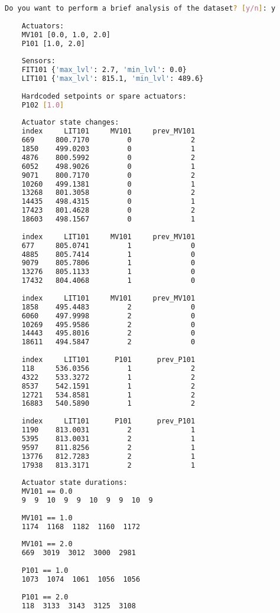 \begin{lstlisting}[language=bash,numbers=none,caption={Example of preliminary system analysis},label=lst:4_brief_infos]
	Do you want to perform a brief analysis of the dataset? [y/n]: y
	
	Actuators: 
	MV101 [0.0, 1.0, 2.0]
	P101 [1.0, 2.0]
	
	Sensors: 
	FIT101 {'max_lvl': 2.7, 'min_lvl': 0.0}
	LIT101 {'max_lvl': 815.1, 'min_lvl': 489.6}
	
	Hardcoded setpoints or spare actuators: 
	P102 [1.0]
	
	Actuator state changes:
	index     LIT101     MV101     prev_MV101
	669     800.7170         0              2
	1850    499.0203         0              1
	4876    800.5992         0              2
	6052    498.9026         0              1
	9071    800.7170         0              2
	10260   499.1381         0              1
	13268   801.3058         0              2
	14435   498.4315         0              1
	17423   801.4628         0              2
	18603   498.1567         0              1
	
	index     LIT101     MV101     prev_MV101
	677     805.0741         1              0
	4885    805.7414         1              0
	9079    805.7806         1              0
	13276   805.1133         1              0
	17432   804.4068         1              0
	
	index     LIT101     MV101     prev_MV101
	1858    495.4483         2              0
	6060    497.9998         2              0
	10269   495.9586         2              0
	14443   495.8016         2              0
	18611   494.5847         2              0
	
	index     LIT101      P101      prev_P101
	118     536.0356         1              2
	4322    533.3272         1              2
	8537    542.1591         1              2
	12721   534.8581         1              2
	16883   540.5890         1              2
	
	index     LIT101      P101      prev_P101
	1190    813.0031         2              1
	5395    813.0031         2              1
	9597    811.8256         2              1
	13776   812.7283         2              1
	17938   813.3171         2              1
	
	Actuator state durations:
	MV101 == 0.0
	9  9  10  9  9  10  9  9  10  9
	
	MV101 == 1.0
	1174  1168  1182  1160  1172
	
	MV101 == 2.0
	669  3019  3012  3000  2981
	
	P101 == 1.0
	1073  1074  1061  1056  1056
	
	P101 == 2.0
	118  3133  3143  3125  3108
\end{lstlisting}

